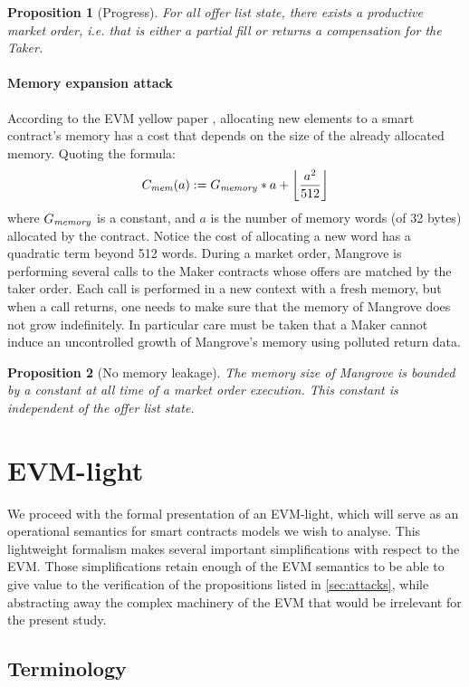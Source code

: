 \documentclass[12pt]{extarticle}
\newtheorem{proposition}{Proposition}
\begin{document}
\begin{proposition}[Progress]
For all offer list state, there exists a \emph{productive} market order, i.e. that is either a partial fill or returns a compensation for the Taker.
\end{proposition}

\paragraph{Memory expansion attack}
According to the EVM yellow paper \cite{Ethereum}, allocating new elements to a smart contract's memory has a cost that depends on the size of the already allocated memory. Quoting the formula:
$$
C_{\it mem}(a) := G_{\it memory}*a+\left\lfloor\dfrac{a^2}{512}\right\rfloor
$$
where $G_{\it memory}$ is a constant, and $a$ is the number of memory words (of 32 bytes) allocated by the contract. Notice the cost of allocating a new word has a quadratic term beyond 512 words. During a market order, Mangrove is performing several calls to the Maker contracts whose offers are matched by the taker order. Each call is performed in a new context with a fresh memory, but when a call returns, one needs to make sure that the memory of Mangrove does not grow indefinitely. In particular care must be taken that a Maker cannot induce an uncontrolled growth of Mangrove's memory using polluted return data. 

\begin{proposition}[No memory leakage]
The memory size of Mangrove is bounded by a constant at all time of a market order execution. This constant is independent of the offer list state.
\end{proposition}

\section{EVM-light}
We proceed with the formal presentation of an EVM-light, which will serve as an operational semantics for smart contracts models we wish to analyse. This lightweight formalism makes several important simplifications with respect to the EVM. Those simplifications retain enough of the EVM semantics to be able to give value to the verification of the propositions listed in \autoref{sec:attacks}, while abstracting away the complex machinery of the EVM that would be irrelevant for the present study.


\subsection{Terminology}
\end{document}
